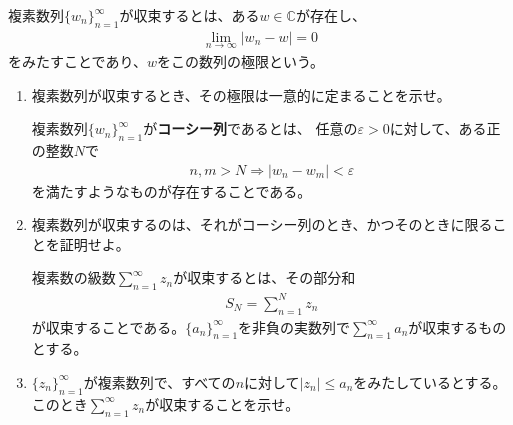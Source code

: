\begin{renshu}
  複素数列$\{w_{n}\}_{n=1}^{\infty}$が収束するとは、ある$w\in\mathbb{C}$が存在し、
\begin{align}
    \lim_{n\to\infty}|w_{n}-w|=0
\end{align}
をみたすことであり、$w$をこの数列の極限という。
\begin{enumerate}
\item 複素数列が収束するとき、その極限は一意的に定まることを示せ。

複素数列$\{w_{n}\}_{n=1}^{\infty}$が\textbf{コーシー列}であるとは、
任意の$\varepsilon>0$に対して、ある正の整数$N$で
\begin{align}
n,m>N\Rightarrow|w_{n}-w_{m}|<\varepsilon
\end{align}
を満たすようなものが存在することである。
\item 複素数列が収束するのは、それがコーシー列のとき、かつそのときに限ることを証明せよ。

複素数の級数$\sum_{n=1}^{\infty}z_{n}$が収束するとは、その部分和
\begin{align}
S_{N}=\sum_{n=1}^{N}z_{n}
\end{align}
が収束することである。$\{a_{n}\}_{n=1}^{\infty}$を非負の実数列で$\sum_{n=1}^{\infty}a_{n}$が収束するものとする。
\item $\{z_{n}\}_{n=1}^{\infty}$が複素数列で、すべての$n$に対して$|z_{n}|\leq a_{n}$をみたしているとする。
このとき$\sum_{n=1}^{\infty}z_{n}$が収束することを示せ。
\end{enumerate}
\end{renshu}

